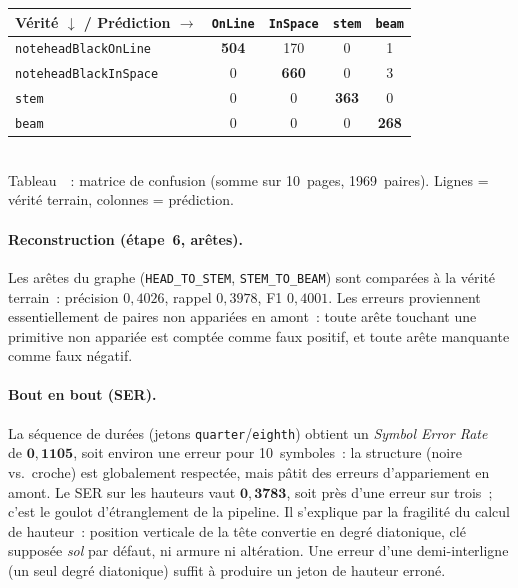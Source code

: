 \documentclass[a4paper,10pt]{article}
\begin{document}
\begin{center}
\label{tab:cm}%
\renewcommand{\arraystretch}{0.95}
\setlength{\tabcolsep}{6pt}
\small
\begin{tabular}{@{}l|cccc@{}}
\hline
\textbf{Vérité $\downarrow$ / Prédiction $\rightarrow$} & \texttt{OnLine} & \texttt{InSpace} & \texttt{stem} & \texttt{beam} \\
\hline
\texttt{noteheadBlackOnLine}  & \textbf{504} & 170 & 0 & 1 \\
\texttt{noteheadBlackInSpace} & 0 & \textbf{660} & 0 & 3 \\
\texttt{stem}                 & 0 & 0 & \textbf{363} & 0 \\
\texttt{beam}                 & 0 & 0 & 0 & \textbf{268} \\
\hline
\end{tabular}\\[3pt]
Tableau~\thetable~: matrice de confusion (somme sur 10~pages, 1969~paires). Lignes = vérité terrain, colonnes = prédiction.
\end{center}

\paragraph{Reconstruction (étape~6, arêtes).}
Les arêtes du graphe (\texttt{HEAD\_TO\_STEM}, \texttt{STEM\_TO\_BEAM}) sont comparées à la vérité terrain~: précision $0{,}4026$, rappel $0{,}3978$, F1 $0{,}4001$. Les erreurs proviennent essentiellement de paires non appariées en amont~: toute arête touchant une primitive non appariée est comptée comme faux positif, et toute arête manquante comme faux négatif.

\paragraph{Bout en bout (SER).}
La séquence de durées (jetons \texttt{quarter}/\texttt{eighth}) obtient un \emph{Symbol Error Rate}~\cite{calvozaragoza2018primus} de $\mathbf{0{,}1105}$, soit environ une erreur pour 10~symboles~: la structure (noire vs.\ croche) est globalement respectée, mais pâtit des erreurs d'appariement en amont. Le SER sur les hauteurs vaut $\mathbf{0{,}3783}$, soit près d'une erreur sur trois~; c'est le goulot d'étranglement de la pipeline. Il s'explique par la fragilité du calcul de hauteur~: position verticale de la tête convertie en degré diatonique, clé supposée \emph{sol} par défaut, ni armure ni altération. Une erreur d'une demi-interligne (un seul degré diatonique) suffit à produire un jeton de hauteur erroné.
\end{document}
